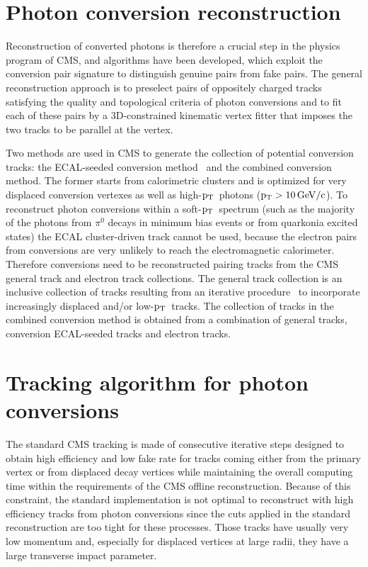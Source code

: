 \documentclass[a4paper]{jpconf}
\def \pt{$\p_{\rm T}$~}
\begin{document}

\section{Photon conversion reconstruction}
\label{standard}


Reconstruction of converted photons is therefore a crucial step in the physics program of CMS, and  algorithms have been developed, which exploit the conversion pair signature to distinguish genuine pairs from fake pairs.
%
The general reconstruction approach is to preselect pairs of oppositely charged tracks satisfying the quality and topological criteria of photon conversions and to fit each of these pairs by a 3D-constrained kinematic vertex 
fitter that imposes the two tracks to be parallel at the vertex. 

Two methods are used in CMS to generate the collection of potential conversion tracks: the ECAL-seeded conversion method~\cite{EGM-10-005}  and the combined conversion method. The former starts from calorimetric clusters and is optimized for very displaced conversion vertexes as well as high-\pt photons ($\rm p_{T} >10{\rm \, GeV}/c$).
To reconstruct photon conversions within a soft-\pt spectrum (such as the majority of the photons from $\pi^0$ decays in minimum bias events or from quarkonia excited states) the ECAL cluster-driven track cannot be used,  because the electron pairs from conversions are very unlikely to reach the electromagnetic calorimeter.
Therefore  conversions need to be reconstructed pairing tracks from the  CMS general track and electron track collections.
The general track collection is 
 an inclusive collection of   tracks resulting from an iterative procedure~\cite{TRK-10-001} to incorporate increasingly displaced and/or low-\pt tracks.
%
 The collection of tracks in the combined conversion method is obtained from a combination of general tracks,  conversion ECAL-seeded tracks and electron tracks.


\section{Tracking algorithm for photon conversions}
\label{sec:newSeedingStep}
 

The standard CMS tracking is made of consecutive iterative steps designed to obtain high efficiency and low fake rate for
tracks coming either from the primary vertex or from displaced decay
vertices while maintaining the overall computing time within the
requirements of the CMS offline reconstruction.
Because of this constraint, the standard implementation is not optimal
to reconstruct with high efficiency tracks from photon conversions
since the cuts applied in the standard
reconstruction are too tight for these processes. Those
tracks have usually very low momentum and, especially for displaced
vertices at large radii, they have a large transverse impact parameter.
\end{document}
